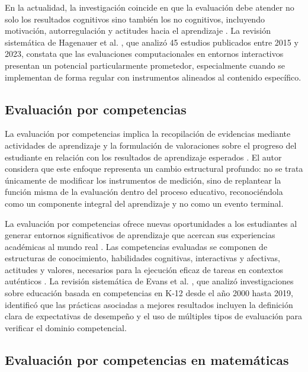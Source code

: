 En la actualidad, la investigación coincide en que la evaluación debe atender no solo los resultados cognitivos sino también los no cognitivos, incluyendo motivación, autorregulación y actitudes hacia el aprendizaje \cite{maskos2025fa}. La revisión sistemática de Hagenauer et al. \cite{maskos2025fa}, que analizó 45 estudios publicados entre 2015 y 2023, constata que las evaluaciones computacionales en entornos interactivos presentan un potencial particularmente prometedor, especialmente cuando se implementan de forma regular con instrumentos alineados al contenido específico.

\subsection{Evaluación por competencias}

La evaluación por competencias implica la recopilación de evidencias mediante actividades de aprendizaje y la formulación de valoraciones sobre el progreso del estudiante en relación con los resultados de aprendizaje esperados \cite{voinea2025competency,oecd2019compass}. El autor considera que este enfoque representa un cambio estructural profundo: no se trata únicamente de modificar los instrumentos de medición, sino de replantear la función misma de la evaluación dentro del proceso educativo, reconociéndola como un componente integral del aprendizaje y no como un evento terminal.

La evaluación por competencias ofrece nuevas oportunidades a los estudiantes al generar entornos significativos de aprendizaje que acercan sus experiencias académicas al mundo real \cite{evans2020cbe}. Las competencias evaluadas se componen de estructuras de conocimiento, habilidades cognitivas, interactivas y afectivas, actitudes y valores, necesarios para la ejecución eficaz de tareas en contextos auténticos \cite{voinea2025competency}. La revisión sistemática de Evans et al. \cite{evans2020cbe}, que analizó investigaciones sobre educación basada en competencias en K-12 desde el año 2000 hasta 2019, identificó que las prácticas asociadas a mejores resultados incluyen la definición clara de expectativas de desempeño y el uso de múltiples tipos de evaluación para verificar el dominio competencial.

\subsection{Evaluación por competencias en matemáticas}

